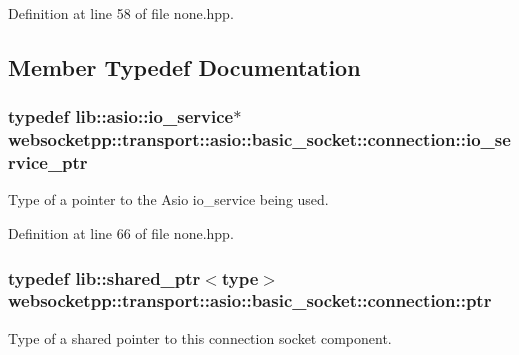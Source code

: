Definition at line 58 of file none.\+hpp.



\subsection{Member Typedef Documentation}
\hypertarget{classwebsocketpp_1_1transport_1_1asio_1_1basic__socket_1_1connection_af4c876008bd8610fb497c5d5be56faab}{}
\subsubsection[{io\+\_\+service\+\_\+ptr}]{\setlength{\rightskip}{0pt plus 5cm}typedef lib\+::asio\+::io\+\_\+service$\ast$ {\bf websocketpp\+::transport\+::asio\+::basic\+\_\+socket\+::connection\+::io\+\_\+service\+\_\+ptr}}\label{classwebsocketpp_1_1transport_1_1asio_1_1basic__socket_1_1connection_af4c876008bd8610fb497c5d5be56faab}


Type of a pointer to the Asio io\+\_\+service being used. 



Definition at line 66 of file none.\+hpp.

\hypertarget{classwebsocketpp_1_1transport_1_1asio_1_1basic__socket_1_1connection_a1a4fa6887235c53c7ddd13307798b280}{}
\subsubsection[{ptr}]{\setlength{\rightskip}{0pt plus 5cm}typedef lib\+::shared\+\_\+ptr$<${\bf type}$>$ {\bf websocketpp\+::transport\+::asio\+::basic\+\_\+socket\+::connection\+::ptr}}\label{classwebsocketpp_1_1transport_1_1asio_1_1basic__socket_1_1connection_a1a4fa6887235c53c7ddd13307798b280}


Type of a shared pointer to this connection socket component. 



